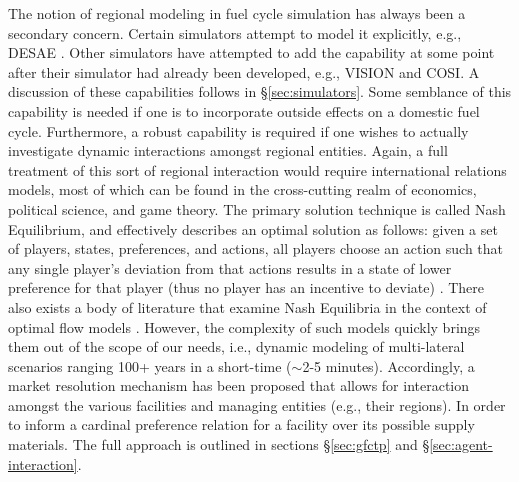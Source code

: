 The notion of regional modeling in fuel cycle simulation has always been a
secondary concern. Certain simulators attempt to model it explicitly, e.g., DESAE
\cite{iaea_nuclear_2010}. Other simulators have attempted to add the capability
at some point after their simulator had already been developed, e.g., VISION and
COSI. A discussion of these capabilities follows in \S\ref{sec:simulators}. Some
semblance of this capability is needed if one is to incorporate outside effects
on a domestic fuel cycle. Furthermore, a robust capability is required if one
wishes to actually investigate dynamic interactions amongst regional
entities. Again, a full treatment of this sort of regional interaction would
require international relations models, most of which can be found in the
cross-cutting realm of economics, political science, and game theory. The
primary solution technique is called Nash Equilibrium, and effectively describes
an optimal solution as follows: given a set of players, states, preferences,
and actions, all players choose an action such that any single player's
deviation from that actions results in a state of lower preference for that
player (thus no player has an incentive to deviate)
\cite{mccarty_political_2007}. There also exists a body of literature that
examine Nash Equilibria in the context of optimal flow models
\cite{mazumdar_fairness_1991,nagurney_supply_2002,song_nash_2002}. However, the
complexity of such models quickly brings them out of the scope of our needs,
i.e., dynamic modeling of multi-lateral scenarios ranging 100+ years in a
short-time ($\sim$2-5 minutes). Accordingly, a market resolution mechanism has
been proposed that allows for interaction amongst the various facilities and
managing entities (e.g., their regions). In order to inform a cardinal preference
\cite{strotz_cardinal_1953} relation for a facility over its possible supply
materials. The full approach is outlined in sections \S\ref{sec:gfctp} and
\S\ref{sec:agent-interaction}.
